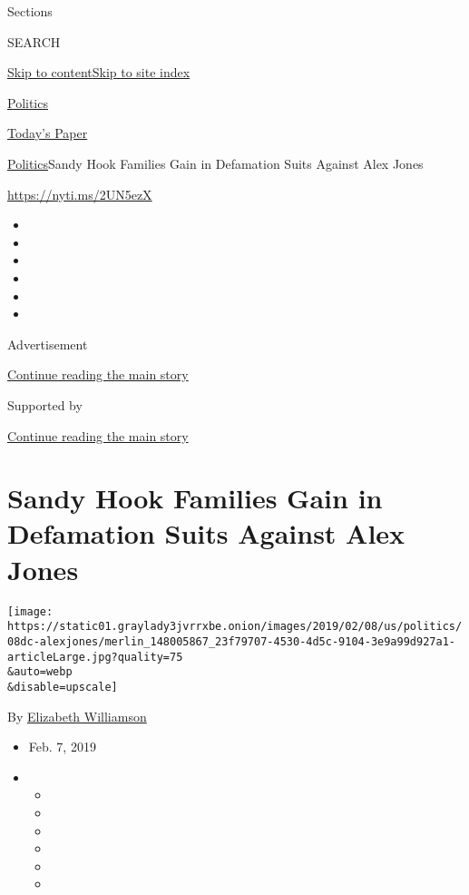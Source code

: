 Sections

SEARCH

\protect\hyperlink{site-content}{Skip to
content}\protect\hyperlink{site-index}{Skip to site index}

\href{https://www.nytimes3xbfgragh.onion/section/politics}{Politics}

\href{https://myaccount.nytimes3xbfgragh.onion/auth/login?response_type=cookie\&client_id=vi}{}

\href{https://www.nytimes3xbfgragh.onion/section/todayspaper}{Today's
Paper}

\href{/section/politics}{Politics}\textbar{}Sandy Hook Families Gain in
Defamation Suits Against Alex Jones

\url{https://nyti.ms/2UN5ezX}

\begin{itemize}
\item
\item
\item
\item
\item
\item
\end{itemize}

Advertisement

\protect\hyperlink{after-top}{Continue reading the main story}

Supported by

\protect\hyperlink{after-sponsor}{Continue reading the main story}

\hypertarget{sandy-hook-families-gain-in-defamation-suits-against-alex-jones}{%
\section{Sandy Hook Families Gain in Defamation Suits Against Alex
Jones}\label{sandy-hook-families-gain-in-defamation-suits-against-alex-jones}}

\texttt{[image: https://static01.graylady3jvrrxbe.onion/images/2019/02/08/us/politics/08dc-alexjones/merlin\_148005867\_23f79707-4530-4d5c-9104-3e9a99d927a1-articleLarge.jpg?quality=75\\\&auto=webp\\\&disable=upscale]}

By
\href{https://www.nytimes3xbfgragh.onion/by/elizabeth-williamson}{Elizabeth
Williamson}

\begin{itemize}
\item
  Feb. 7, 2019
\item
  \begin{itemize}
  \item
  \item
  \item
  \item
  \item
  \item
  \end{itemize}
\end{itemize}

